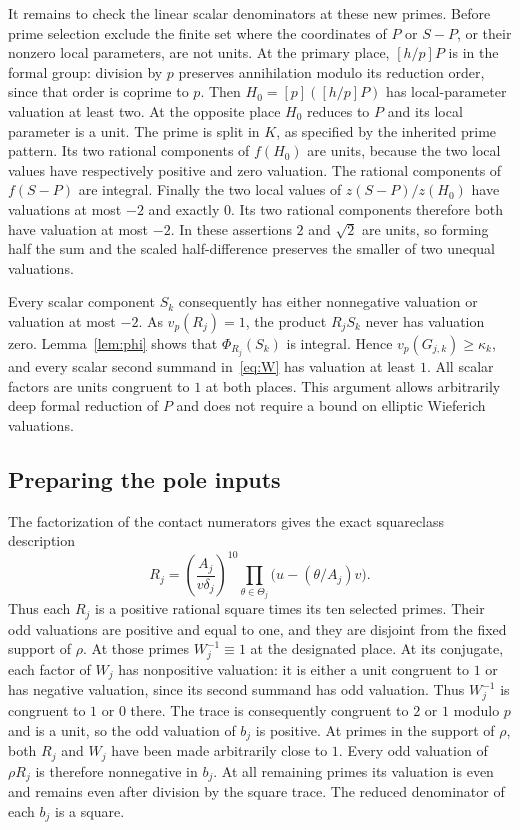 \documentclass[11pt,a4paper]{article}
\begin{document}
It remains to check the linear scalar denominators at these new
primes. Before prime selection exclude the finite set where the
coordinates of $P$ or $S-P$, or their nonzero local parameters,
are not units. At the primary place, $[h/p]P$ is in the formal
group: division by $p$ preserves annihilation modulo its reduction
order, since that order is coprime to $p$. Then
$H_0=[p]([h/p]P)$ has local-parameter valuation at least two.
At the opposite place $H_0$ reduces to $P$ and its local parameter
is a unit. The prime is split in $K$, as specified by the inherited
prime pattern. Its two rational components of $f(H_0)$ are units,
because the two local values have respectively positive and zero
valuation. The rational components of $f(S-P)$ are integral.
Finally the two local values of $z(S-P)/z(H_0)$ have valuations
at most $-2$ and exactly $0$. Its two rational components therefore
both have valuation at most $-2$. In these assertions $2$ and
$\sqrt2$ are units, so forming half the sum and the scaled
half-difference preserves the smaller of two unequal valuations.

Every scalar component $S_k$ consequently has either nonnegative
valuation or valuation at most $-2$. As $v_p(R_j)=1$, the product
$R_jS_k$ never has valuation zero. Lemma~\ref{lem:phi} shows
that $\Phi_{R_j}(S_k)$ is integral. Hence $v_p(G_{j,k})\ge\kappa_k$,
and every scalar second summand in~\eqref{eq:W} has valuation
at least $1$. All scalar factors are units congruent to $1$ at
both places. This argument allows arbitrarily deep formal reduction
of $P$ and does not require a bound on elliptic Wieferich valuations.

\subsection{Preparing the pole inputs}

The factorization of the contact numerators gives the exact squareclass
description
\[
 R_j=\left(\frac{A_j}{v\delta_j}\right)^{10}
                  \prod_{\theta\in\Theta_j}
                    \bigl(u-(\theta/A_j)v\bigr).
\]
Thus each $R_j$ is a positive rational square times its ten selected
primes. Their odd valuations are positive and equal to one, and they
are disjoint from the fixed support of $\rho$. At those primes
$W_j^{-1}\equiv1$ at the designated place. At its conjugate,
each factor of $W_j$ has nonpositive valuation: it is either a
unit congruent to $1$ or has negative valuation, since its second
summand has odd valuation. Thus $W_j^{-1}$ is congruent to $1$
or $0$ there. The trace is consequently congruent to $2$ or $1$
modulo $p$ and is a unit, so the odd valuation of $b_j$ is positive.
At primes in the support of
$\rho$, both $R_j$ and $W_j$ have been made arbitrarily close
to $1$. Every odd valuation of $\rho R_j$ is therefore nonnegative
in $b_j$. At all remaining primes its valuation is even and remains
even after division by the square trace. The reduced denominator
of each $b_j$ is a square.
\end{document}
